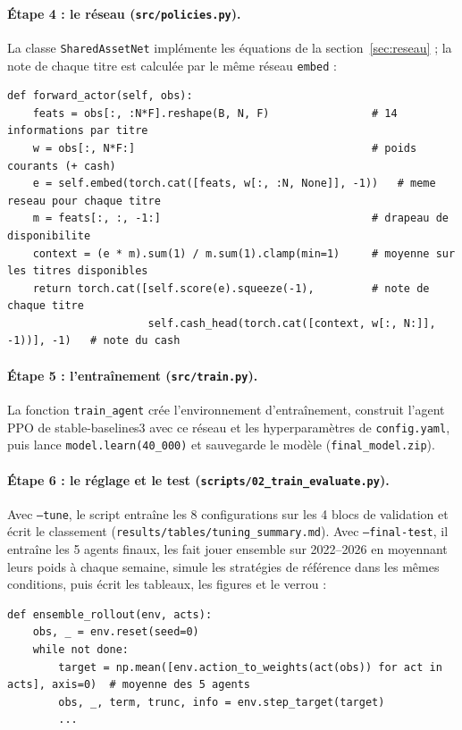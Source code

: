 \documentclass[11pt,a4paper]{article}
\begin{document}
\paragraph{Étape 4 : le réseau (\texttt{src/policies.py}).} La classe \texttt{SharedAssetNet} implémente les
équations de la section~\ref{sec:reseau} ; la note de chaque titre est calculée par le même réseau \texttt{embed} :

\begin{lstlisting}
def forward_actor(self, obs):
    feats = obs[:, :N*F].reshape(B, N, F)                # 14 informations par titre
    w = obs[:, N*F:]                                     # poids courants (+ cash)
    e = self.embed(torch.cat([feats, w[:, :N, None]], -1))   # meme reseau pour chaque titre
    m = feats[:, :, -1:]                                 # drapeau de disponibilite
    context = (e * m).sum(1) / m.sum(1).clamp(min=1)     # moyenne sur les titres disponibles
    return torch.cat([self.score(e).squeeze(-1),         # note de chaque titre
                      self.cash_head(torch.cat([context, w[:, N:]], -1))], -1)   # note du cash
\end{lstlisting}

\paragraph{Étape 5 : l'entraînement (\texttt{src/train.py}).} La fonction \texttt{train\_agent} crée l'environnement
d'entraînement, construit l'agent PPO de stable-baselines3 avec ce réseau et les hyperparamètres de
\texttt{config.yaml}, puis lance \texttt{model.learn(40\_000)} et sauvegarde le modèle
(\texttt{final\_model.zip}).

\paragraph{Étape 6 : le réglage et le test (\texttt{scripts/02\_train\_evaluate.py}).} Avec \texttt{--tune}, le
script entraîne les 8 configurations sur les 4 blocs de validation et écrit le classement
(\texttt{results/tables/tuning\_summary.md}). Avec \texttt{--final-test}, il entraîne les 5 agents finaux, les fait
jouer ensemble sur 2022--2026 en moyennant leurs poids à chaque semaine, simule les stratégies de référence dans
les mêmes conditions, puis écrit les tableaux, les figures et le verrou :

\begin{lstlisting}
def ensemble_rollout(env, acts):
    obs, _ = env.reset(seed=0)
    while not done:
        target = np.mean([env.action_to_weights(act(obs)) for act in acts], axis=0)  # moyenne des 5 agents
        obs, _, term, trunc, info = env.step_target(target)
        ...
\end{lstlisting}
\end{document}
